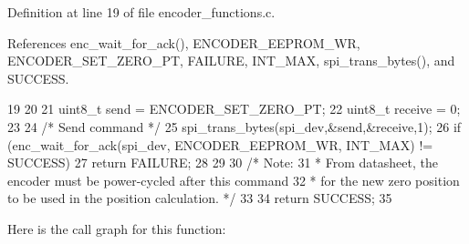 Definition at line 19 of file encoder\_\-functions.c.



References enc\_\-wait\_\-for\_\-ack(), ENCODER\_\-EEPROM\_\-WR, ENCODER\_\-SET\_\-ZERO\_\-PT, FAILURE, INT\_\-MAX, spi\_\-trans\_\-bytes(), and SUCCESS.




\begin{DoxyCode}
19                              {
20 
21     uint8_t send = ENCODER_SET_ZERO_PT;
22     uint8_t receive = 0;
23     
24     /* Send command */
25     spi_trans_bytes(spi_dev,&send,&receive,1);
26     if (enc_wait_for_ack(spi_dev, ENCODER_EEPROM_WR, INT_MAX) != SUCCESS){ 
27         return FAILURE;
28     }
29 
30     /* Note: 
31      *   From datasheet, the encoder must be power-cycled after this command
32      *   for the new zero position to be used in the position calculation. */
33 
34     return SUCCESS;
35 }
\end{DoxyCode}




Here is the call graph for this function:


